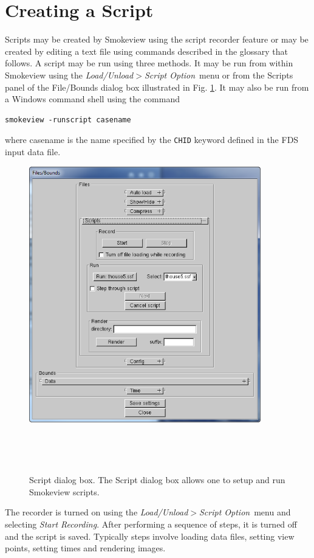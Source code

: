 \documentclass[11pt,twoside]{book}
\begin{document}
\section{Creating a Script}
Scripts may be created by Smokeview using the script recorder
feature or may be created by editing a text file using commands
described in the glossary that follows. A script may be run using
three methods.  It may be run from within Smokeview using the {\em
Load/Unload$>$Script Option}\ menu or from the Scripts panel of
the File/Bounds dialog box illustrated in Fig.
\ref{figSCRIPT}. It may also be run from a Windows command shell
using the command

\begin{lstlisting}
smokeview -runscript casename
\end{lstlisting}

\noindent where casename is the name specified by the {\tt CHID}
keyword defined in the FDS input data file.

\begin{figure}[bph]
\centerline{
\includegraphics[width=3.972222in]{FIGURES/figSCRIPT}
}\ \caption[Script dialog box.]{Script dialog box.
The Script dialog box allows one to setup and run Smokeview
scripts. }\ \label{figSCRIPT}
\end{figure}

The recorder is turned on using the
{\em Load/Unload$>$Script Option}\ menu and selecting {\em Start Recording}.
After performing a sequence of steps, it is turned off and the
script is saved. Typically steps involve loading data files,
setting view points, setting times and rendering images.
\end{document}
